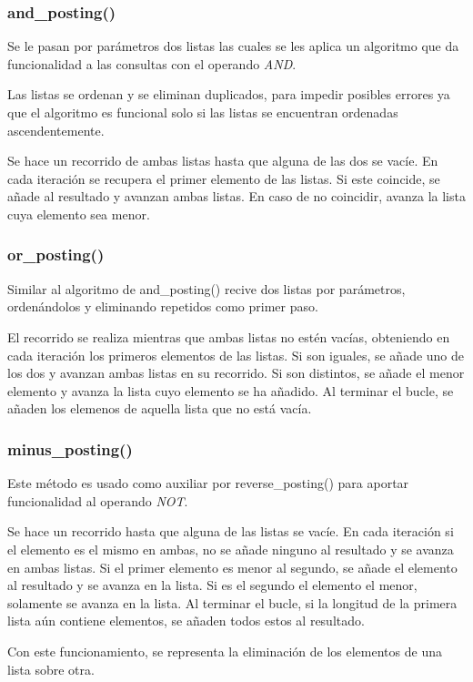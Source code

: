 \documentclass[12pt,a4paper]{article}
\begin{document}
\subsubsection{and\_posting()}
Se le pasan por parámetros dos listas las cuales se les aplica un algoritmo que da funcionalidad a las consultas con el operando \textit{AND}.

Las listas se ordenan y se eliminan duplicados, para impedir posibles errores ya que el algoritmo es funcional solo si las listas se encuentran ordenadas ascendentemente.

Se hace un recorrido de ambas listas hasta que alguna de las dos se vacíe. En cada iteración se recupera el primer elemento de las listas. Si este coincide, se añade al resultado y avanzan ambas listas. En caso de no coincidir, avanza la lista cuya elemento sea menor.

\subsubsection{or\_posting()}
Similar al algoritmo de and\_posting() recive dos listas por parámetros, ordenándolos y eliminando repetidos como primer paso.

El recorrido se realiza mientras que ambas listas no estén vacías, obteniendo en cada iteración los primeros elementos de las listas. Si son iguales, se añade uno de los dos y avanzan ambas listas en su recorrido. Si son distintos, se añade el menor elemento y avanza la lista cuyo elemento se ha añadido. Al terminar el bucle, se añaden los elemenos de aquella lista que no está vacía.

\subsubsection{minus\_posting()}

Este método es usado como auxiliar por reverse\_posting() para aportar funcionalidad al operando \textit{NOT}.

Se hace un recorrido hasta que alguna de las listas se vacíe. En cada iteración si el elemento es el mismo en ambas, no se añade ninguno al resultado y se avanza en ambas listas. Si el primer elemento es menor al segundo, se añade el elemento al resultado y se avanza en la lista. Si es el segundo el elemento el menor, solamente se avanza en la lista. Al terminar el bucle, si la longitud de la primera lista aún contiene elementos, se añaden todos estos al resultado.

Con este funcionamiento, se representa la eliminación de los elementos de una lista sobre otra.
\end{document}
